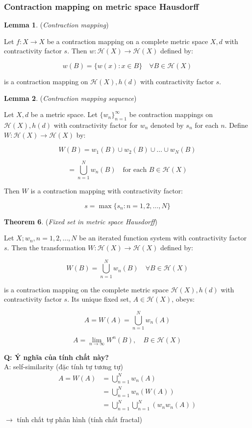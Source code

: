 \pagebreak
\subsubsection{Contraction mapping on metric space Hausdorff}

\textbf{Lemma 1}. (\textit{Contraction mapping})

Let \(f: X \rightarrow X\) be a contraction mapping on a complete metric space \(X, d\) with contractivity factor \(s\). Then \(w: \mathcal{H}(X) \rightarrow \mathcal{H}(X)\) defined by:

\[
w(B) = \{w(x) : x \in B\} \quad \forall B \in \mathcal{H}(X)
\]

is a contraction mapping on \(\mathcal{H}(X), h(d)\) with contractivity factor \(s\).

\textbf{Lemma 2}. (\textit{Contraction mapping sequence})

Let \(X, d\) be a metric space. Let \(\{w_n\}_{n=1}^\infty\) be contraction mappings on \(\mathcal{H}(X), h(d)\) with contractivity factor for \(w_n\) denoted by \(s_n\) for each \(n\). Define \(W: \mathcal{H}(X) \rightarrow \mathcal{H}(X)\) by:

\[
W(B) = w_1(B) \cup w_2(B) \cup \ldots \cup w_N(B)
\]

\[
= \bigcup_{n=1}^N w_n(B) \quad \text{for each } B \in \mathcal{H}(X)
\]

Then \(W\) is a contraction mapping with contractivity factor:

\[
s = \max\{s_n : n = 1, 2, \ldots, N\}
\]

\textbf{Theorem 6}. (\textit{Fixed set in metric space Hausdorff})

Let $X; w_n, n = 1,2, \ldots, N$ be an iterated function system with contractivity factor \(s\). Then the transformation \(W: \mathcal{H}(X) \rightarrow \mathcal{H}(X)\) defined by:

\[
W(B) = \bigcup_{n=1}^N w_n(B) \quad \forall B \in \mathcal{H}(X)
\]

is a contraction mapping on the complete metric space \(\mathcal{H}(X), h(d)\) with contractivity factor \(s\). Its unique fixed set, \(A \in \mathcal{H}(X)\), obeys:

\[
A = W(A) = \bigcup_{n=1}^N w_n(A)
\]

\[
A = \lim_{n \to \infty} W^n(B), \quad B \in \mathcal{H}(X)
\]

\textbf{Q: Ý nghĩa của tính chất này?}\\
A: self-similarity (đặc tính tự tương tự)
\begin{align*}
    A = W(A)
    &= \bigcup_{n=1}^N w_n(A)\\
    &= \bigcup_{n=1}^N w_n(W(A))\\
    &= \bigcup_{n=1}^N\bigcup_{n=1}^N (w_n w_n(A))\\
\end{align*}
$\rightarrow$ tính chất tự phân hình (tính chất fractal)

